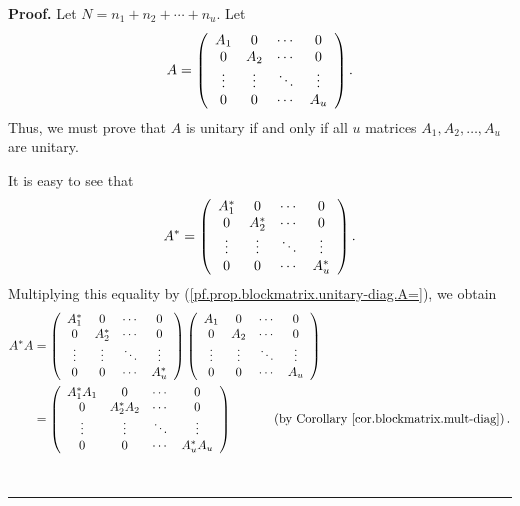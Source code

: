\documentclass[numbers=enddot,12pt,final,onecolumn,notitlepage]{scrartcl}%
\numberwithin{exer}{subsection}
\theoremstyle{definition}
\newenvironment{proof}[1][Proof]{\noindent\textbf{#1.} }{\ \rule{0.5em}{0.5em}}
\begin{document}
\begin{proof}
Let $N=n_{1}+n_{2}+\cdots+n_{u}$. Let
\begin{equation}
A=\left(
\begin{array}
[c]{cccc}%
A_{1} & 0 & \cdots & 0\\
0 & A_{2} & \cdots & 0\\
\vdots & \vdots & \ddots & \vdots\\
0 & 0 & \cdots & A_{u}%
\end{array}
\right)  . \label{pf.prop.blockmatrix.unitary-diag.A=}%
\end{equation}
Thus, we must prove that $A$ is unitary if and only if all $u$ matrices
$A_{1},A_{2},\ldots,A_{u}$ are unitary.

It is easy to see that
\[
A^{\ast}=\left(
\begin{array}
[c]{cccc}%
A_{1}^{\ast} & 0 & \cdots & 0\\
0 & A_{2}^{\ast} & \cdots & 0\\
\vdots & \vdots & \ddots & \vdots\\
0 & 0 & \cdots & A_{u}^{\ast}%
\end{array}
\right)  .
\]
Multiplying this equality by (\ref{pf.prop.blockmatrix.unitary-diag.A=}), we
obtain%
\begin{align*}
A^{\ast}A  &  =\left(
\begin{array}
[c]{cccc}%
A_{1}^{\ast} & 0 & \cdots & 0\\
0 & A_{2}^{\ast} & \cdots & 0\\
\vdots & \vdots & \ddots & \vdots\\
0 & 0 & \cdots & A_{u}^{\ast}%
\end{array}
\right)  \left(
\begin{array}
[c]{cccc}%
A_{1} & 0 & \cdots & 0\\
0 & A_{2} & \cdots & 0\\
\vdots & \vdots & \ddots & \vdots\\
0 & 0 & \cdots & A_{u}%
\end{array}
\right) \\
&  =\left(
\begin{array}
[c]{cccc}%
A_{1}^{\ast}A_{1} & 0 & \cdots & 0\\
0 & A_{2}^{\ast}A_{2} & \cdots & 0\\
\vdots & \vdots & \ddots & \vdots\\
0 & 0 & \cdots & A_{u}^{\ast}A_{u}%
\end{array}
\right)  \ \ \ \ \ \ \ \ \ \ \left(  \text{by Corollary
\ref{cor.blockmatrix.mult-diag}}\right)  .

\end{align*}
\end{proof}
\end{document}
